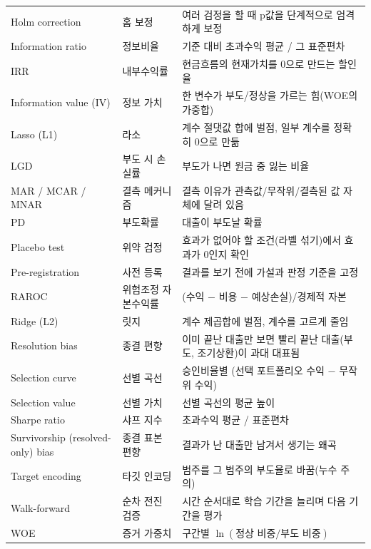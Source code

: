 {\begin{longtable}{@{}p{43mm}p{40mm}p{70mm}@{}}
Holm correction & 홈 보정 & 여러 검정을 할 때 p값을 단계적으로 엄격하게 보정\\
Information ratio & 정보비율 & 기준 대비 초과수익 평균 / 그 표준편차\\
IRR & 내부수익률 & 현금흐름의 현재가치를 0으로 만드는 할인율\\
Information value (IV) & 정보 가치 & 한 변수가 부도/정상을 가르는 힘(WOE의 가중합)\\
Lasso (L1) & 라소 & 계수 절댓값 합에 벌점, 일부 계수를 정확히 0으로 만듦\\
LGD & 부도 시 손실률 & 부도가 나면 원금 중 잃는 비율\\
MAR / MCAR / MNAR & 결측 메커니즘 & 결측 이유가 관측값/무작위/결측된 값 자체에 달려 있음\\
PD & 부도확률 & 대출이 부도날 확률\\
Placebo test & 위약 검정 & 효과가 없어야 할 조건(라벨 섞기)에서 효과가 0인지 확인\\
Pre-registration & 사전 등록 & 결과를 보기 전에 가설과 판정 기준을 고정\\
RAROC & 위험조정 자본수익률 & (수익 $-$ 비용 $-$ 예상손실)/경제적 자본\\
Ridge (L2) & 릿지 & 계수 제곱합에 벌점, 계수를 고르게 줄임\\
Resolution bias & 종결 편향 & 이미 끝난 대출만 보면 빨리 끝난 대출(부도, 조기상환)이 과대 대표됨\\
Selection curve & 선별 곡선 & 승인비율별 (선택 포트폴리오 수익 $-$ 무작위 수익)\\
Selection value & 선별 가치 & 선별 곡선의 평균 높이\\
Sharpe ratio & 샤프 지수 & 초과수익 평균 / 표준편차\\
Survivorship (resolved-only) bias & 종결 표본 편향 & 결과가 난 대출만 남겨서 생기는 왜곡\\
Target encoding & 타깃 인코딩 & 범주를 그 범주의 부도율로 바꿈(누수 주의)\\
Walk-forward & 순차 전진 검증 & 시간 순서대로 학습 기간을 늘리며 다음 기간을 평가\\
WOE & 증거 가중치 & 구간별 $\ln(\text{정상 비중}/\text{부도 비중})$\\\bottomrule
\end{longtable}}

